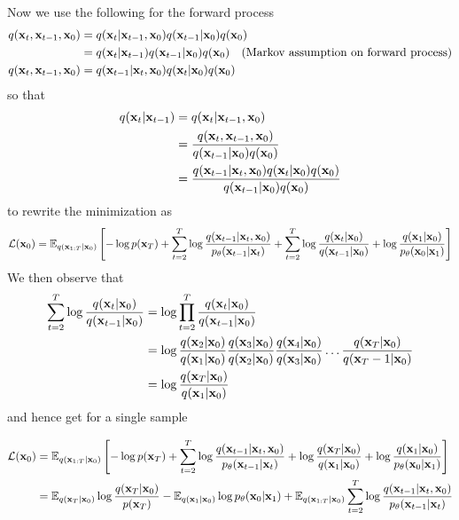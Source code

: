 Now we use the following for the forward process
\begin{align}
    q(\rvx_t, \rvx_{t-1}, \rvx_0) & = q(\rvx_t | \rvx_{t-1}, \rvx_0) q(\rvx_{t-1} | \rvx_0) q(\rvx_0) \nn
    & = q(\rvx_t | \rvx_{t-1}) q(\rvx_{t-1} | \rvx_0) q(\rvx_0) \quad \text{(Markov assumption on forward process)} \nn
    q(\rvx_t, \rvx_{t-1}, \rvx_0) & = q(\rvx_{t-1} | \rvx_t, \rvx_0) q(\rvx_t | \rvx_0) q(\rvx_0)
\end{align}
so that
\begin{align}
    q(\rvx_t | \rvx_{t-1}) &= q(\rvx_t | \rvx_{t-1}, \rvx_0) \nn
    &= \frac{q(\rvx_t, \rvx_{t-1}, \rvx_0)}{q(\rvx_{t-1} | \rvx_0) q(\rvx_0)} \nn
    &= \frac{q(\rvx_{t-1} | \rvx_t, \rvx_0) q(\rvx_t | \rvx_0) q(\rvx_0)}{q(\rvx_{t-1} | \rvx_0) q(\rvx_0)}
\end{align}
to rewrite the minimization as
\begin{align}
    \Ls(\rvx_0) &= \E_{q(\rvx_{1:T} | \rvx_0)} \left[ - \log p(\rvx_T) + \sum_{t=2}^T \log \frac{q(\rvx_{t-1} | \rvx_t, \rvx_0)}{\pt(\rvx_{t-1} | \rvx_t) } + \sum_{t=2}^T \log \frac{q(\rvx_t | \rvx_0)}{q(\rvx_{t-1} | \rvx_0)} + \log \frac{q(\rvx_1 | \rvx_0)}{\pt(\rvx_0 | \rvx_1) } \right] \nn
\end{align} 
We then observe that
\begin{align}
    \sum_{t=2}^T \log \frac{q(\rvx_t | \rvx_0)}{q(\rvx_{t-1} | \rvx_0)} &= \log \prod_{t=2}^T \frac{q(\rvx_t | \rvx_0)}{q(\rvx_{t-1} | \rvx_0)} \nn
    &= \log \frac{q(\rvx_2 | \rvx_0)}{q(\rvx_1 | \rvx_0)}\frac{q(\rvx_3 | \rvx_0)}{q(\rvx_2 | \rvx_0)}\frac{q(\rvx_4 | \rvx_0)}{q(\rvx_3 | \rvx_0)} \ldots \frac{q(\rvx_T | \rvx_0)}{q(\rvx_T-1 | \rvx_0)} \nn
    &= \log \frac{q(\rvx_T | \rvx_0)}{q(\rvx_1 | \rvx_0)}
\end{align}
and hence get for a single sample

\begin{align}\label{eq:ELBOSingleVar}
    \Ls(\rvx_0)
    &= \E_{q(\rvx_{1:T} | \rvx_0)} \left[ - \log p(\rvx_T) + \sum_{t=2}^T \log \frac{q(\rvx_{t-1} | \rvx_t, \rvx_0)}{\pt(\rvx_{t-1} | \rvx_t) } + \log \frac{q(\rvx_T | \rvx_0)}{q(\rvx_1 | \rvx_0)} + \log \frac{q(\rvx_1 | \rvx_0)}{\pt(\rvx_0 | \rvx_1) } \right] \nn
    &= \E_{q(\rvx_{T}  | \rvx_0)} \log \frac{q(\rvx_T | \rvx_0)}{p(\rvx_T)}
    - \E_{q(\rvx_1  | \rvx_0)} \log \pt(\rvx_0 | \rvx_1)
    + \E_{q(\rvx_{1:T} | \rvx_0)} \sum_{t=2}^T \log \frac{q(\rvx_{t-1} | \rvx_t, \rvx_0)}{\pt(\rvx_{t-1} | \rvx_t) } 
\end{align}


